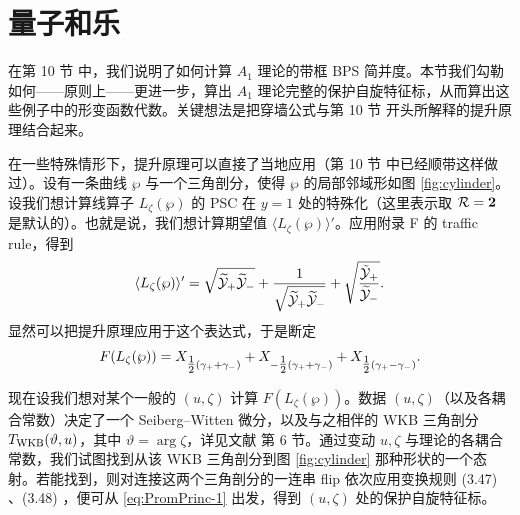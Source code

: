 
\section{量子和乐}\label{sec:Quantum-Holonomy}

在第 10 节%
中，我们说明了如何计算 $A_1$ 理论的带框 BPS 简并度。本节我们勾勒如何——原则上——更进一步，算出 $A_1$ 理论完整的保护自旋特征标，从而算出这些例子中的形变函数代数。关键想法是把穿墙公式与第 10 节%
开头所解释的提升原理结合起来。


在一些特殊情形下，提升原理可以直接了当地应用（第 10 节%
中已经顺带这样做过）。设有一条曲线 $\wp$ 与一个三角剖分，使得 $\wp$ 的局部邻域形如图 \ref{fig:cylinder}。设我们想计算线算子 $L_\zeta(\wp)$ 的 PSC 在 $y=1$ 处的特殊化（这里表示取 $\mathcal{R}=\mathbf{2}$ 是默认的）。也就是说，我们想计算期望值 $\langle L_\zeta(\wp)\rangle'$。应用附录 F %
的 traffic rule，得到
\begin{equation}\label{eq:Prime-Wilson-Spec}
\langle L_\zeta(\wp)\rangle' = \sqrt{\widetilde{\cal Y}_+\widetilde{\cal Y}_-} + \frac{1}{\sqrt{\widetilde{\cal Y}_+\widetilde{\cal Y}_-}} + \sqrt{\frac{\tilde{\mathcal{Y}}_+}{\widetilde{\cal Y}_-}}.
\end{equation}
显然可以把提升原理应用于这个表达式，于是断定
\begin{equation}\label{eq:PromPrinc-1}
F(L_\zeta(\wp)) = X_{\tfrac{1}{2}(\gamma_+ + \gamma_-)} + X_{-\tfrac{1}{2}(\gamma_+ + \gamma_-)} + X_{\tfrac{1}{2}(\gamma_+ - \gamma_-)}.
\end{equation}

现在设我们想对某个一般的 $(u,\zeta)$ 计算 $F(L_\zeta(\wp))$。数据 $(u,\zeta)$（以及各耦合常数）决定了一个 Seiberg--Witten 微分，以及与之相伴的 WKB 三角剖分 $T_{\rm WKB}(\vartheta,u)$，其中 $\vartheta=\arg\zeta$，详见文献 \cite{Gaiotto:2009hg} 第 6 节。通过变动 $u,\zeta$ 与理论的各耦合常数，我们试图找到从该 WKB 三角剖分到图 \ref{fig:cylinder} 那种形状的一个态射。若能找到，则对连接这两个三角剖分的一连串 flip 依次应用变换规则 (3.47)%
、(3.48)%
，便可从 \eqref{eq:PromPrinc-1}
出发，得到 $(u,\zeta)$ 处的保护自旋特征标。


